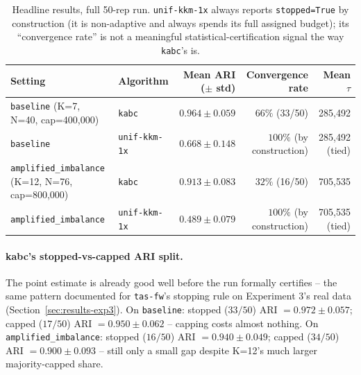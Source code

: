 \documentclass[11pt]{article}
\begin{document}
\begin{table}[h]
\centering
\small
\begin{tabular}{llrrr}
\toprule
Setting & Algorithm & Mean ARI ($\pm$ std) & Convergence rate & Mean $\tau$ \\
\midrule
\texttt{baseline} (K=7, N=40, cap=400{,}000) & \texttt{kabc} & $0.964 \pm 0.059$ & $66\%$ (33/50) & 285{,}492 \\
\texttt{baseline} & \texttt{unif-kkm-1x} & $0.668 \pm 0.148$ & $100\%$ (by construction) & 285{,}492 (tied) \\
\texttt{amplified\_imbalance} (K=12, N=76, cap=800{,}000) & \texttt{kabc} & $0.913 \pm 0.083$ & $32\%$ (16/50) & 705{,}535 \\
\texttt{amplified\_imbalance} & \texttt{unif-kkm-1x} & $0.489 \pm 0.079$ & $100\%$ (by construction) & 705{,}535 (tied) \\
\bottomrule
\end{tabular}
\caption{Headline results, full 50-rep run. \texttt{unif-kkm-1x} always
reports \texttt{stopped=True} by construction (it is non-adaptive and
always spends its full assigned budget); its ``convergence rate'' is not a
meaningful statistical-certification signal the way \texttt{kabc}'s is.}
\label{tab:exp4-headline}
\end{table}

\paragraph{kabc's stopped-vs-capped ARI split.} The point estimate is
already good well before the run formally certifies -- the same pattern
documented for \texttt{tas-fw}'s stopping rule on Experiment 3's real data
(Section~\ref{sec:results-exp3}). On \texttt{baseline}:
stopped ($33/50$) ARI $=0.972\pm0.057$; capped ($17/50$) ARI
$=0.950\pm0.062$ -- capping costs almost nothing. On
\texttt{amplified\_imbalance}: stopped ($16/50$) ARI $=0.940\pm0.049$;
capped ($34/50$) ARI $=0.900\pm0.093$ -- still only a small gap despite
K=12's much larger majority-capped share.
\end{document}

